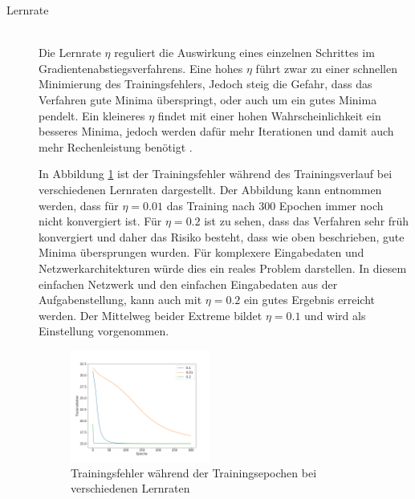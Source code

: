 \begin{description}
	\item[Lernrate]\hfill \\
	Die Lernrate $\eta$ reguliert die Auswirkung eines einzelnen Schrittes im Gradientenabstiegsverfahrens. Eine hohes $\eta$ führt zwar zu einer schnellen Minimierung des Trainingsfehlers, Jedoch steig die Gefahr, dass das Verfahren gute Minima überspringt, oder auch um ein gutes Minima pendelt. Ein kleineres $\eta$ findet mit einer hohen Wahrscheinlichkeit ein besseres Minima, jedoch werden dafür mehr Iterationen und damit auch mehr Rechenleistung benötigt \cite{neuronalenetze}.
	
	In Abbildung \ref*{fig:learning_rates} ist der Trainingsfehler während des Trainingsverlauf bei verschiedenen Lernraten dargestellt. Der Abbildung kann entnommen werden, dass für $\eta=0.01$ das Training nach 300 Epochen immer noch nicht konvergiert ist. Für $\eta=0.2$ ist zu sehen, dass das Verfahren sehr früh konvergiert und daher das Risiko besteht, dass wie oben beschrieben, gute Minima übersprungen wurden. Für komplexere Eingabedaten und Netzwerkarchitekturen würde dies ein reales Problem darstellen. In diesem einfachen Netzwerk und den einfachen Eingabedaten aus der Aufgabenstellung, kann auch mit $\eta=0.2$ ein gutes Ergebnis erreicht werden. Der Mittelweg beider Extreme bildet $\eta=0.1$ und wird als Einstellung vorgenommen.
	
	\begin{figure}[ht]
		\centering
		\vspace*{-0.9 cm}
		\includegraphics[width = 0.45\textwidth]{Bilder/learning_rates.png}
		\caption{Trainingsfehler während der Trainingsepochen bei verschiedenen Lernraten}
		\label{fig:learning_rates}
	\end{figure}
	

\end{description}
